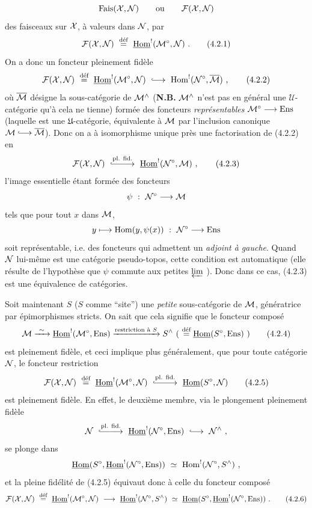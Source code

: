 \[
\mathrm{Fais}(\cX,\cN) \qquad \text{ou} \qquad \cF(\cX,\cN)
\]
des faisceaux sur $\cX$, à valeurs dans $\cN$, par
\[
\cF(\cX,\cN) \ \defeq\ \uHom^{!}(\cM^{\circ},\cN) \ .
\tag*{(4.2.1)}
\]
On a donc un foncteur pleinement fidèle
\[
\cF(\cX,\cN) \ \defeq\ \uHom^{!}(\cM^{\circ},\cN) \ \linj\ \Hom^{!}(\cN^{\circ},\overline{\cM}) \ ,
\tag*{(4.2.2)}
\]
où $\overline{\cM}$ désigne la sous-catégorie de $\cM^{\wedge}$ (\textbf{N.B.} $\cM^{\wedge}$ n'est pas en général une $\mathcal{U}$-catégorie qu'à cela ne tienne) formée des foncteurs \textit{représentables} $\cM^{\circ}\longrightarrow\Ens$ (laquelle est une $\mathfrak{U}$-catégorie, équivalente à $\cM$ par l'inclusion canonique $\cM \linj \overline{\cM}$). Donc on a à isomorphisme unique près une factorisation de (4.2.2) en
\[
\cF(\cX,\cN) \ \overset{\text{pl. fid.}}{\lhook\joinrel\relbar\joinrel\relbar\joinrel\longrightarrow}\ \uHom^{!}(\cN^{\circ},\cM) \ ,
\tag*{(4.2.3)}
\]
l'image essentielle étant formée des foncteurs
\[
\psi \ :\ \cN^{\circ} \longrightarrow \cM
\]
tels que pour tout $x$ dans $\cM$,
\[
y \longmapsto \Hom(y,\psi(x)) \ :\ \cN^{\circ} \longrightarrow \Ens
\]
soit représentable, i.e. des foncteurs qui
admettent un \textit{adjoint à gauche}. Quand $\cN$ lui-même est une catégorie pseudo-topos, cette condition est automatique (elle résulte de l'hypothèse que $\psi$ commute aux petites $\varprojlim$ ). Donc dans ce cas, (4.2.3) est une équivalence de catégories.

Soit maintenant $S$ ($S$ comme “site”) une \textit{petite} sous-catégorie de $\cM$, génératrice par épimorphismes stricts. On sait que cela signifie que le foncteur composé
\[
\cM \xrightarrow{\ \sim\ } \uHom^{!}(\cM^{\circ},\Ens) \xrightarrow{\text{restriction à } S} S^{\wedge} \ (\ \defeq \uHom(S^{\circ},\Ens)\ )
\tag*{(4.2.4)}
\]
est pleinement fidèle, et ceci implique plus généralement, que pour toute catégorie $\cN$, le foncteur restriction
\[
\cF(\cX,\cN) \ \defeq\ \uHom^{!}(\cM^{\circ},\cN) \ \overset{\text{pl. fid.}}{\lhook\joinrel\relbar\joinrel\relbar\joinrel\longrightarrow}\ \uHom(S^{\circ},\cN)
\tag*{(4.2.5)}
\]
est pleinement fidèle. En effet, le deuxième membre, via le plongement pleinement fidèle
\[
\cN \ \overset{\text{pl. fid.}}{\lhook\joinrel\relbar\joinrel\relbar\joinrel\longrightarrow}\ \uHom^{!}(\cN^{\circ},\Ens) \ \linj\ \cN^{\wedge} \ ,
\]
se plonge dans
\[
\uHom(S^{\circ},\uHom^{!}(\cN^{\circ},\Ens)) \ \simeq\ \Hom^{!}(\cN^{\circ},S^{\wedge}) \ ,
\]
et la pleine fidélité de (4.2.5) équivaut donc à celle du foncteur composé
\[
\cF(\cX,\cN) \ \defeq\ \uHom^{!}(\cM^{\circ},\cN) \ \longrightarrow\ \uHom^{!}(\cN^{\circ},S^{\wedge}) \ \simeq\ \uHom(S^{\circ},\uHom^{!}(\cN^{\circ},\Ens)) \ .
\tag*{(4.2.6)}
\]

